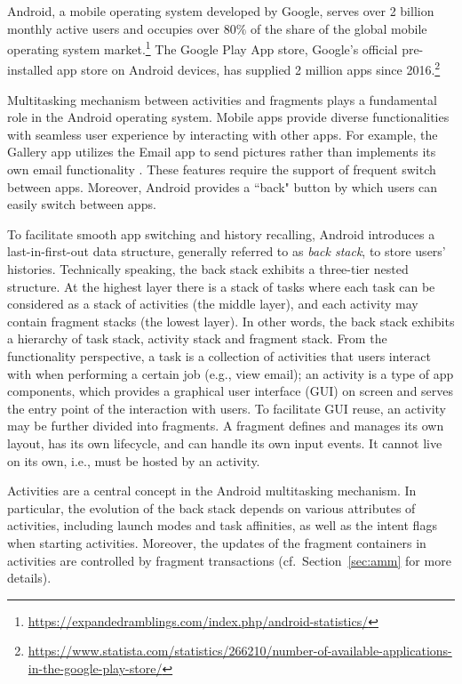 
Android, a mobile operating system developed by Google, serves over 2 billion monthly active users and occupies over $80\%$ of the share of the global mobile operating system market.\footnote{\url{https://expandedramblings.com/index.php/android-statistics/}}
The Google Play App store, Google's official pre-installed app store on Android devices, has supplied 2 million apps since 2016.\footnote{\url{https://www.statista.com/statistics/266210/number-of-available-applications-in-the-google-play-store/}} 

Multitasking mechanism between activities and fragments plays a fundamental role in the Android operating system. Mobile apps provide diverse functionalities with seamless user experience by interacting with other apps.
For example, the Gallery app utilizes the Email app to send pictures rather than implements its own email
functionality \cite{LHR17}. These features require the support of frequent switch between apps. Moreover, Android provides a ``back" button by which users can easily switch between apps. 

To facilitate smooth app switching and history recalling, Android introduces a last-in-first-out data structure, generally referred to as \emph{back stack}, to store users’ histories.
Technically speaking, the back stack exhibits a three-tier nested structure. At the highest layer there is a stack of tasks where each task can be considered as a stack of activities (the middle layer), and each activity may contain fragment stacks (the lowest layer). In other words, the back stack exhibits a hierarchy of task stack, activity stack and fragment stack. From the functionality perspective, a task %
is a collection of activities that users interact with when performing a certain job (e.g., view email); an activity is a type of app components, which provides a graphical user interface (GUI) on screen and serves the entry point of the interaction with users. To facilitate GUI reuse, an activity may be further divided into fragments. 
A fragment defines and manages its own layout, has its own lifecycle, and can handle its own input events. It cannot live on its own, i.e., must be hosted by an activity. 

Activities are a central concept in the Android multitasking mechanism. In particular, 
the evolution of %
the back stack depends on various attributes of activities, including launch modes and task affinities, as well as the intent flags when starting activities. 
Moreover, the updates of the fragment containers in activities are controlled by fragment transactions (cf.\ Section~\ref{sec:amm} for more details).

